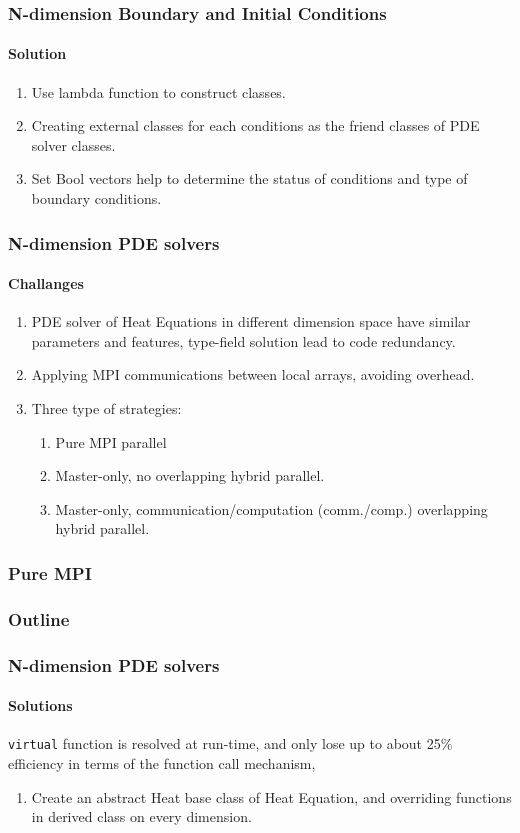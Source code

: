 \begin{frame}
  \frametitle{N-dimension Boundary and Initial Conditions}
  \framesubtitle{Solution}
  \begin{enumerate}
    \item Use lambda function to construct classes.
    \item Creating external classes for each conditions as the friend classes of PDE solver classes.
    \item Set Bool vectors help to determine the status of conditions and type of boundary conditions.
  \end{enumerate}
\end{frame}


\begin{frame}
  \frametitle{N-dimension PDE solvers}
  \framesubtitle{Challanges}
  \begin{enumerate}
    \item PDE solver of Heat Equations in different dimension space have similar parameters and features, type-field solution lead to code redundancy.
    \item Applying MPI communications between local arrays, avoiding overhead.
    \item Three type of strategies:
    \begin{enumerate}
      \item Pure MPI parallel
      \item Master-only, no overlapping hybrid parallel.
      \item Master-only, communication/computation (comm./comp.) overlapping hybrid parallel.
    \end{enumerate}
  \end{enumerate}
\end{frame}


\subsubsection{Pure MPI}
\begin{frame}
  \frametitle{Outline}
    \begingroup
    \setcounter{tocdepth}{3}
    \tableofcontents[currentsection, sectionstyle=show/hide, subsectionstyle=show/shaded, subsubsectionstyle=show/shaded, hideothersubsections]
    \endgroup
\end{frame}
\begin{frame}
  \frametitle{N-dimension PDE solvers}
  \framesubtitle{Solutions}
  \texttt{virtual} function is resolved at run-time, and only lose up to about 25\% efficiency in terms of the function call mechanism, 
  \begin{enumerate}
    \item Create an abstract Heat base class of Heat Equation, and overriding functions in derived class on every dimension.
  \end{enumerate}
\end{frame}


